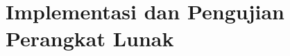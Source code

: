 \chapter{Implementasi dan Pengujian Perangkat Lunak}
\label{chap: Implementasi dan Pengujian Perangkat Lunak}

